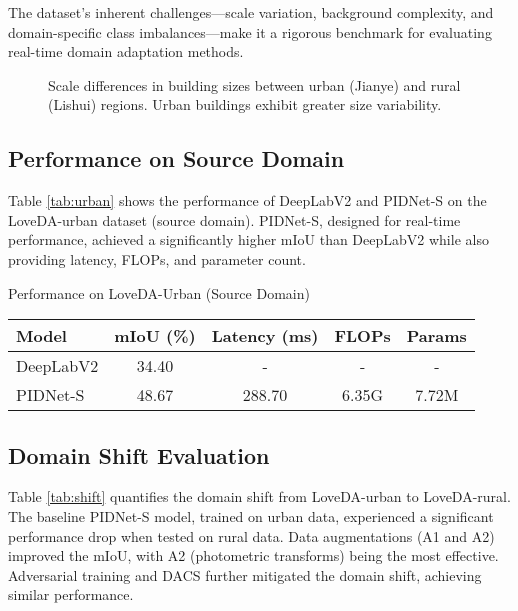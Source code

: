 \documentclass{article}
\begin{document}
\begin{multicols}{2}
		The dataset’s inherent challenges—scale variation, background complexity, and domain-specific class imbalances—make it a rigorous benchmark for evaluating real-time domain adaptation methods.  
		
		\begin{figure}[ht]  
			\centering  

			\caption{Scale differences in building sizes between urban (Jianye) and rural (Lishui) regions. Urban buildings exhibit greater size variability.}  
			\label{fig:scale}  
		\end{figure}
		\subsection{Performance on Source Domain}
		Table \ref{tab:urban} shows the performance of DeepLabV2 and PIDNet-S on the LoveDA-urban dataset (source domain). PIDNet-S, designed for real-time performance, achieved a significantly higher mIoU than DeepLabV2 while also providing latency, FLOPs, and parameter count.
		
			\vspace{2cm}
			\centering
			\caption{Performance on LoveDA-Urban (Source Domain)}
			\label{tab:urban}
			\tiny
			\begin{tabular}{|l|c|c|c|c|}
				\hline
				Model & mIoU (\%) & Latency (ms) & FLOPs & Params \\ \hline
				DeepLabV2 & 34.40 & - & - & - \\ \hline
				PIDNet-S & 48.67 & 288.70 & 6.35G & 7.72M \\ \hline
			\end{tabular}
				\vspace{0.2cm}
		
		
		
		

		
		\subsection{Domain Shift Evaluation}
		\small
		Table \ref{tab:shift} quantifies the domain shift from LoveDA-urban to LoveDA-rural. The baseline PIDNet-S model, trained on urban data, experienced a significant performance drop when tested on rural data. Data augmentations (A1 and A2) improved the mIoU, with A2 (photometric transforms) being the most effective. Adversarial training and DACS further mitigated the domain shift, achieving similar performance.
		


\end{multicols}
\end{document}
